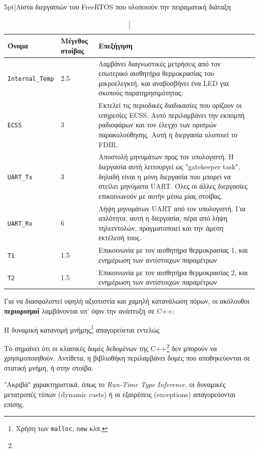 \documentclass[a4paper,nobib]{tufte-book}
\begin{document}
\begin{table}[h]
	\centering
	\caption[][5pt]{Λίστα διεργασιών του Free\acs{RTOS} που υλοποιούν την πειραματική διάταξη}
	\label{tab:rtos-tasks}
	\renewcommand{\arraystretch}{1.5}
	\begin{tabularx}{\textwidth}{@{}llX@{}}
		\toprule
		Όνομα & Μέγεθος στοίβας & Επεξήγηση \\ \midrule
		\texttt{Internal\_Temp} & \SI{2.5}{\kilo\byte} & Λαμβάνει διαγνωστικές μετρήσεις από τον εσωτερικό αισθητήρα θερμοκρασίας του μικροελεγκτή, και αναβοσβήνει ένα LED για σκοπούς παρατηρησιμότητας. \\
		\texttt{ECSS} & \SI{3}{\kilo\byte} & Εκτελεί τις περιοδικές διαδικασίες που ορίζουν οι υπηρεσίες \acs{ECSS}. Αυτό περιλαμβάνει την εκπομπή ραδιοφάρων και τον έλεγχο των ορισμών παρακολούθησης. Αυτή η διεργασία υλοποιεί το \acs{FDIR}. \\
		\texttt{\acs{UART}\_Tx} & \SI{3}{\kilo\byte} & Αποστολή μηνυμάτων προς τον υπολογιστή. Η διεργασία αυτή λειτουργεί ως "gatekeeper task", δηλαδή είναι η μόνη διεργασία που μπορεί να στείλει μηνύματα \acs{UART}. Όλες οι άλλες διεργασίες επικοινωνούν με αυτήν μέσω μίας στοίβας. \\
		\texttt{\acs{UART}\_Rx} & \SI{6}{\kilo\byte} & Λήψη μηνυμάτων \acs{UART} από τον υπολογιστή. Για απλότητα, αυτή η διεργασία, πέρα από λήψη τηλεεντολών, πραγματοποιεί και την άμεση εκτέλεσή τους. \\
		\texttt{T1} & \SI{1.5}{\kilo\byte} & Επικοινωνία με τον αισθητήρα θερμοκρασίας 1, και ενημέρωση των αντίστοιχων παραμέτρων \\
		\texttt{T2} & \SI{1.5}{\kilo\byte} & Επικοινωνία με τον αισθητήρα θερμοκρασίας 2, και ενημέρωση των αντίστοιχων παραμέτρων \\ \bottomrule
	\end{tabularx}
\end{table}

Για να διασφαλιστεί υψηλή αξιοπιστία και χαμηλή κατανάλωση πόρων, οι ακόλουθοι \textbf{περιορισμοί} λαμβάνονται υπ' όψιν την ανάπτυξη σε C++:
\begin{compactenum}
	\item Η δυναμική κατανομή μνήμης\footnote{Χρήση των \texttt{malloc}, \texttt{new} κλπ.} απαγορεύεται εντελώς
	\label{itm:malloc}
	\item Το  σημαίνει ότι οι κλασικές δομές δεδομένων της C++\footnote{} δεν μπορούν να χρησιμοποιηθούν. Αντίθετα, η βιβλιοθήκη  περιλαμβάνει δομές που αποθηκεύονται σε στατική μνήμη, ή στην στοίβα.
	\item "Ακριβά" χαρακτηριστικά, όπως το \emph{Run-Time Type Inference}, οι δυναμικές μετατροπές τύπων (dynamic casts) ή οι εξαιρέσεις (exceptions) απαγορεύονται επίσης.
\end{compactenum}
\end{document}
